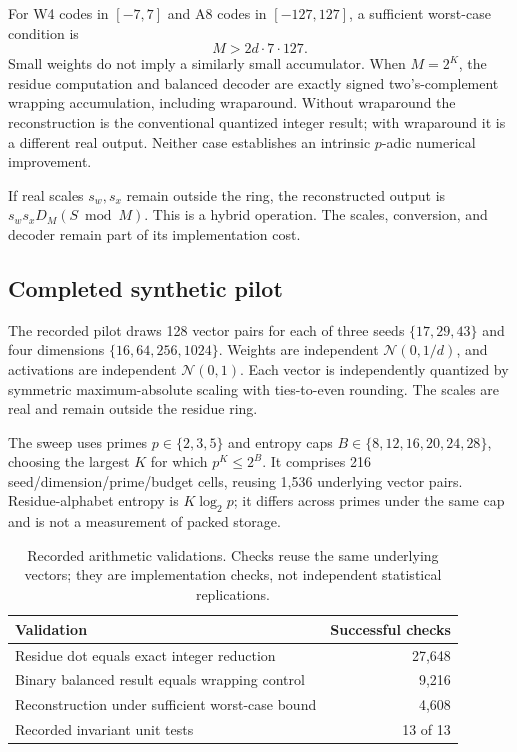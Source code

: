 \documentclass[11pt]{article}
\begin{document}
For W4 codes in \([-7,7]\) and A8 codes in \([-127,127]\), a sufficient
worst-case condition is
\[
 M>2d\cdot7\cdot127.
\]
Small weights do not imply a similarly small accumulator. When \(M=2^K\),
the residue computation and balanced decoder are exactly signed
two's-complement wrapping accumulation, including wraparound.
Without wraparound the reconstruction is the conventional quantized integer
result; with wraparound it is a different real output. Neither case
establishes an intrinsic \(p\)-adic numerical improvement.

If real scales \(s_w,s_x\) remain outside the ring, the reconstructed
output is \(s_ws_xD_M(S\bmod M)\). This is a hybrid operation. The scales,
conversion, and decoder remain part of its implementation cost.

\subsection{Completed synthetic pilot}

The recorded pilot draws 128 vector pairs for each of three seeds
\(\{17,29,43\}\) and four dimensions
\(\{16,64,256,1024\}\). Weights are independent
\(\mathcal{N}(0,1/d)\), and activations are independent
\(\mathcal{N}(0,1)\). Each vector is independently quantized by symmetric
maximum-absolute scaling with ties-to-even rounding.
The scales are real and remain outside the residue ring.

The sweep uses primes \(p\in\{2,3,5\}\) and entropy caps
\(B\in\{8,12,16,20,24,28\}\), choosing the largest \(K\) for which
\(p^K\leq2^B\). It comprises 216 seed/dimension/prime/budget cells,
reusing 1,536 underlying vector pairs. Residue-alphabet entropy is
\(K\log_2p\); it differs across primes under the same cap and is not a
measurement of packed storage.

\begin{table}[htbp]
\centering
\caption{Recorded arithmetic validations. Checks reuse the same underlying
vectors; they are implementation checks, not independent statistical replications.}
\begin{tabular}{lr}
\toprule
Validation & Successful checks\\
\midrule
Residue dot equals exact integer reduction & 27,648\\
Binary balanced result equals wrapping control & 9,216\\
Reconstruction under sufficient worst-case bound & 4,608\\
Recorded invariant unit tests & 13 of 13\\
\bottomrule
\end{tabular}
\label{tab:checks}
\end{table}
\end{document}
